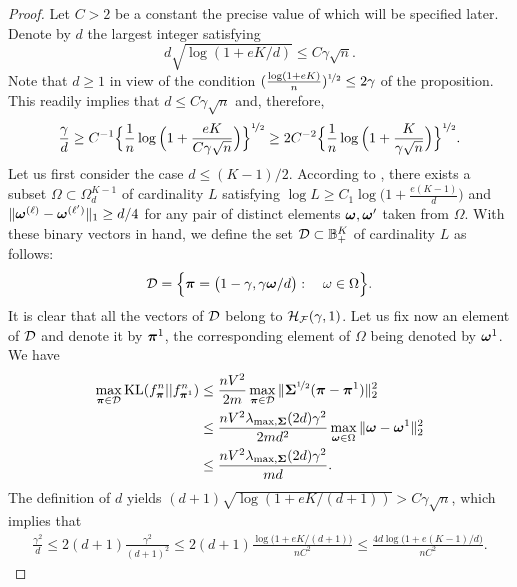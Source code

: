 \begin{proof}
	Let $C>2$ be a constant the precise value of which will be specified later.
	Denote by  $d$ the largest integer satisfying
	\begin{equation}\label{eqFvSxFv}
	d\sqrt{\log(1+eK/d)} \leq C{\gamma\sqrt{n}}.
	\end{equation}
	Note that $d\ge 1$ in view of the condition $(\frac{\log(1+eK)}{n})^{\nicefrac12}\le 2\gamma$ of the 
	proposition. This readily implies that $d\leq C\gamma\sqrt{n}$ and, therefore, 
	\begin{equation}\label{eqFvSxSx}
	\frac{\gamma}{d} 
	\ge C^{-1}\Big\{{\frac1n\log\Big(1+\frac{eK}{C\gamma\sqrt{n}}\Big)}\Big\}^{\nicefrac12}
	\ge 2C^{-2}\Big\{{\frac1n\log\Big(1+\frac{K}{\gamma\sqrt{n}}\Big)}\Big\}^{\nicefrac12}.
	\end{equation}
	Let us first consider the case $d \leq (K-1)/2$. According to , there 
	exists a subset $\Omega \subset \Omega_{d}^{K-1}$ of cardinality $L$ satisfying 
	$\log L\geq C_1\log\big(1+\frac{e(K-1)}{d}\big)$ and $\|\boldsymbol \omega^{(\ell)}-\boldsymbol \omega^{(\ell')}\|_1\geq d/4$
	for any pair of distinct elements $\boldsymbol \omega,\boldsymbol \omega'$ taken from $\Omega$. With these 
	binary vectors in hand, we define the set $\mathcal D \subset {\mathbb B}_+^K$ of cardinality $L$ as follows:
	\begin{equation}
	\mathcal D = \Big\{\boldsymbol \pi = \big(1-\gamma,{\gamma}\boldsymbol \omega/{d}\big) : \quad\omega \in \Omega\Big\}.
	\end{equation}
	It is clear that all the vectors of $\mathcal D$ belong to $\mathcal H_\mathcal F(\gamma,1)$. 
	Let us fix now an element of $\mathcal D$ and denote it by $\boldsymbol \pi^1$, the corresponding element of
	$\Omega$ being denoted by $\boldsymbol \omega^1$. We have
	\begin{align}
	\max_{\boldsymbol \pi\in\mathcal D}{\rm KL}(f^n_{\boldsymbol \pi}||f^n_{\boldsymbol \pi^1})
	&\leq \frac{nV^2}{2m}\max_{\boldsymbol \pi\in\mathcal D} \|\boldsymbol\Sigma^{\nicefrac12}(\boldsymbol \pi-\boldsymbol \pi^{1})\|_2^2 \\
	&\leq \frac{nV^2\lambda_{\max,\boldsymbol\Sigma}(2d)\gamma^2}{2m d^2} \max_{\boldsymbol \omega\in\Omega}
	\|\boldsymbol \omega-\boldsymbol \omega^{1}\|_2^2\\
	&\leq \frac{nV^2\lambda_{\max,\boldsymbol\Sigma}(2d)\gamma^2}{m d}. \label{eqKLlowerBoundInq}
	\end{align}
	The definition of $d$ yields $(d+1)\sqrt{\log(1+eK/(d+1))}> C\gamma\sqrt{n}$, which implies that
	\begin{align}
	\frac{\gamma^2}{d}
	\leq 2(d+1)\frac{\gamma^2}{(d+1)^2}
	\leq 2(d+1)\frac{\log\big(1+eK/(d+1)\big)}{nC^2}
	\leq \frac{4d\log\big(1+e(K-1)/d\big)}{nC^2}.
	\end{align}

\end{proof}
